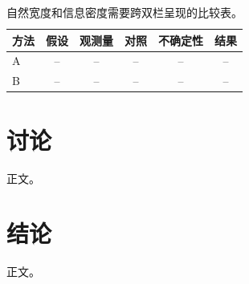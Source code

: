 \documentclass[UTF8,a4paper,10pt,twocolumn,fontset=fandol]{ctexart}
\theoremstyle{definition}
\theoremstyle{remark}
\begin{document}
\begin{table}[t]
  \caption{自然宽度和信息密度需要跨双栏呈现的比较表。\label{tab:two-column-zh}}
  \begin{tabular*}{\textwidth}{@{\extracolsep{\fill}}lccccc@{}}
  \toprule
  方法 & 假设 & 观测量 & 对照 & 不确定性 & 结果 \\
  \midrule
  A & -- & -- & -- & -- & -- \\
  B & -- & -- & -- & -- & -- \\
  \bottomrule
  \end{tabular*}
\end{table}


\section{讨论}

正文。

\section{结论}

正文。

\end{document}
